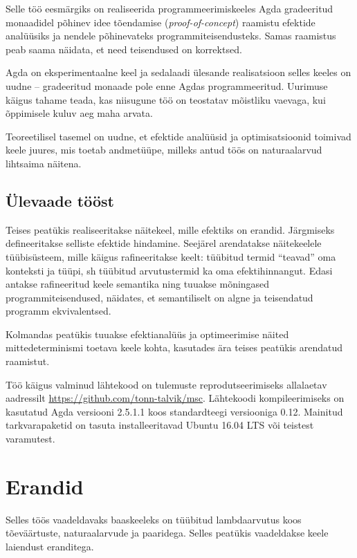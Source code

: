\documentclass[a4paper,12pt]{article}
\begin{document}
Selle töö eesmärgiks on realiseerida programmeerimiskeeles Agda gradeeritud monaadidel põhinev idee tõendamise (\emph{proof-of-concept}) 
raamistu efektide analüüsiks ja nendele põhinevateks programmiteisendusteks.
Samas raamistus peab saama näidata, et need teisendused on korrektsed.

Agda on eksperimentaalne keel ja sedalaadi ülesande realisatsioon selles keeles on uudne -- gradeeritud monaade pole enne Agdas programmeeritud.
Uurimuse käigus tahame teada, kas niisugune töö on teostatav mõistliku vaevaga, kui õppimisele kuluv aeg maha arvata.

Teoreetilisel tasemel on uudne, et efektide analüüsid ja optimisatsioonid toimivad keele juures, mis toetab andmetüüpe, milleks antud töös on naturaalarvud lihtsaima näitena.

\subsection{Ülevaade tööst}
Teises peatükis realiseeritakse näitekeel, mille efektiks on erandid.
Järgmiseks defineeritakse selliste efektide hindamine.
Seejärel arendatakse näitekeelele tüübisüsteem, mille käigus rafineeritakse keelt: tüübitud termid ``teavad'' oma konteksti ja tüüpi, sh tüübitud arvutustermid ka oma efektihinnangut.
Edasi antakse rafineeritud keele semantika ning tuuakse mõningased programmiteisendused, näidates, et semantiliselt on algne ja teisendatud programm ekvivalentsed.

Kolmandas peatükis tuuakse efektianalüüs ja optimeerimise näited mittedeterminismi toetava keele kohta, kasutades ära teises peatükis arendatud raamistut.

Töö käigus valminud lähtekood on tulemuste reprodutseerimiseks allalaetav aadressilt \url{https://github.com/tonn-talvik/msc}.
Lähtekoodi kompileerimiseks on kasutatud Agda versiooni 2.5.1.1 koos standardteegi versiooniga 0.12.
Mainitud tarkvarapaketid on tasuta installeeritavad Ubuntu 16.04 LTS või teistest varamutest.

\clearpage\vspace*{0pt}

\section{Erandid}\label{sec:exc}

Selles töös vaadeldavaks baaskeeleks on tüübitud lambdaarvutus koos tõeväärtuste, naturaalarvude ja paaridega.
Selles peatükis vaadeldakse keele laiendust eranditega.
\end{document}
